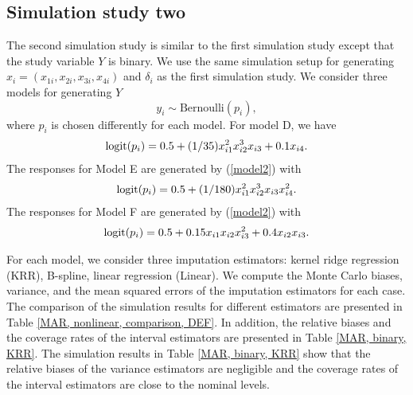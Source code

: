 \documentclass[12pt]{article}
\newcommand{\bx}{{x}}
\begin{document}
\subsection{Simulation study two} 

The second simulation study is similar to the first simulation study except that the study variable $Y$ is binary. We use the same simulation setup for generating $\bx_i = (x_{1i}, x_{2i}, x_{3i}, x_{4i})$ and $\delta_i$ as the first simulation study. We consider three models for generating $Y$ 
\begin{equation}
y_{i} \sim \mbox{Bernoulli}(p_{i}), \label{model2} 
\end{equation}
where $p_{i}$ is chosen differently  for each model. 
For model D, we have
\begin{align}
\mbox{logit}(p_{i}) =  0.5 + (1/35)x_{i1}^{2}x_{i2}^{3}x_{i3} +  0.1x_{i4}.\notag
\end{align}
The responses for Model E are generated by (\ref{model2}) with 
\begin{align}
\mbox{logit}(p_{i}) =  0.5 + (1/180)x_{i1}^{2}x_{i2}^{3}x_{i3}x_{i4}^{2}.\notag
\end{align}
The responses for Model F are generated by (\ref{model2}) with 
\begin{align}
\mbox{logit}(p_{i}) =  0.5 + 0.15x_{i1}x_{i2}x_{i3}^{2} +  0.4x_{i2}x_{i3}.\notag
\end{align}

For each model, we consider three imputation estimators: kernel ridge regression (KRR), B-spline, linear regression (Linear). We compute the Monte Carlo biases, variance, and the mean squared errors of the imputation estimators for each case.  {The comparison of the simulation 
results for different estimators  are} presented in Table \ref{MAR, nonlinear, comparison, DEF}. In addition, the relative biases and the coverage rates of the interval estimators  are presented in Table \ref{MAR, binary, KRR}. The simulation results in Table \ref{MAR, binary, KRR} show that the relative biases of the  variance estimators are negligible  and the coverage rates of the interval estimators are close to the nominal levels. 
\end{document}
